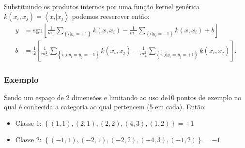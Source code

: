 Substituindo os produtos internos por uma função kernel genérica $k\left(x_{i},x_{j}\right)=\left\langle x_{i}|x_{j}\right\rangle $  podemos reescrever então:
\begin{equation}
\begin{split}
y & =\text{sgn}\left[\frac{1}{m_{+}}\sum_{\left\{ i|y_{i}=+1\right\} }k\left(x,x_{i}\right)-\frac{1}{m_{-}}\sum_{\left\{ i|y_{i}=-1\right\} }k\left(x,x_{i}\right)+b\right]\\
b & =\frac{1}{2}\left[\frac{1}{m_{-}^{2}}\sum_{\left\{ i,j|y_{i}=y_{j}=-1\right\} }k\left(x_{i},x_{j}\right)-\frac{1}{m_{+}^{2}}\sum_{\left\{ i,j|y_{i}=y_{j}=+1\right\} }k\left(x_{i},x_{j}\right)\right] .
\end{split} 
\end{equation}
\subsubsection{Exemplo}

Sendo um espaço de 2 dimensões e limitando ao uso  de10 pontos  de exemplo no qual é conhecida a categoria ao qual pertencem (5 em cada). Então:
\begin{itemize}
\item Classe 1: $\left\{ \left(1,1\right),\left(2,1\right),\left(2,2\right),\left(4,3\right),\left(1,2\right)\right\} =+1$
\item Classe 2: $\left\{ \left(-1,1\right),\left(-2,1\right),\left(-2,2\right),\left(-4,3\right),\left(-1,2\right)\right\} =-1$
\end{itemize}


